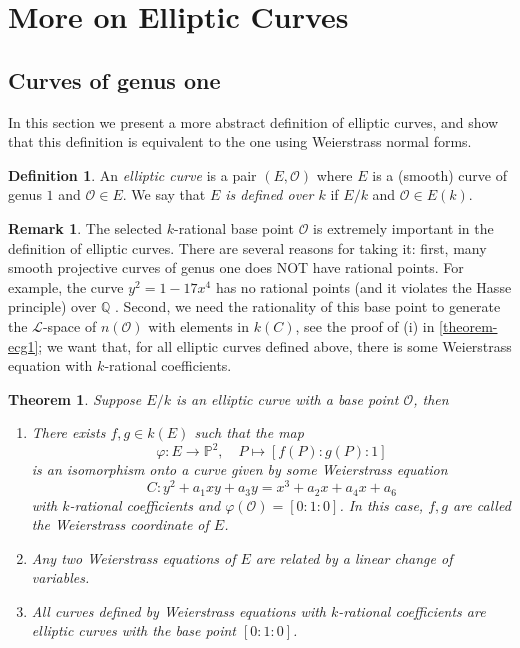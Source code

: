 \documentclass[12pt]{article}
\newtheorem{theorem}{Theorem}[subsection]
\theoremstyle{remark}
\theoremstyle{definition}
\newtheorem{remark}{Remark}[subsection]
\newtheorem{definition}{Definition}[subsection]
\newcommand{\ecO}[0]{\mathcal O}
\newcommand{\Pc}{\mathbb{P}}   %
\begin{document}
        
        
        
        
        
    \section{More on Elliptic Curves}
        \subsection{Curves of genus one}
        In this section we present a more abstract definition of elliptic curves, and show that this definition is equivalent to the one using Weierstrass normal forms.
        \begin{definition}
            An \textit{elliptic curve} is a pair $(E, \mathcal O)$ where $E$ is a (smooth) curve of genus $1$ and $\mathcal O\in E$. We say that \textit{$E$ is defined over $k$} if $E/k$ and $\mathcal O\in E(k)$.
        \end{definition}
        \begin{remark}
            The selected $k$-rational base point $\ecO$ is extremely important in the definition of elliptic curves. There are several reasons for taking it: first, many smooth projective curves of genus one does NOT have rational points. For example, the curve $y^2=1-17x^4$ has no rational points (and it violates the Hasse principle) over $\mathbb Q$ \cite{Poonen}. Second, we need the rationality of this base point to generate the $\mathcal L$-space of $n(\ecO)$ with elements in $k(C)$, see the proof of (i) in \autoref{theorem-ecg1}; we want that, for all elliptic curves defined above, there is some Weierstrass equation with $k$-rational coefficients. 
        \end{remark}
        \begin{theorem}\label{theorem-ecg1}
        Suppose $E/k$ is an elliptic curve with a base point $\mathcal O$, then
        \begin{enumerate}[\normalfont(i)]
            \item There exists $f, g\in k(E)$ such that the map
            \[\varphi:E\to\Pc^2,\quad P\mapsto [f(P):g(P):1]\]
            is an isomorphism onto a curve given by some Weierstrass equation
            \[C:y^2+a_1xy+a_3y=x^3+a_2x+a_4x+a_6\]
            with $k$-rational coefficients and $\varphi(\mathcal O)=[0:1:0]$. In this case, $f, g$ are called the \textit{Weierstrass coordinate of $E$}.
            \item Any two Weierstrass equations of $E$ are related by a linear change of variables.
            \item All curves defined by Weierstrass equations with $k$-rational coefficients are elliptic curves with the base point $[0:1:0]$.
        \end{enumerate}
        \end{theorem}
\end{document}
